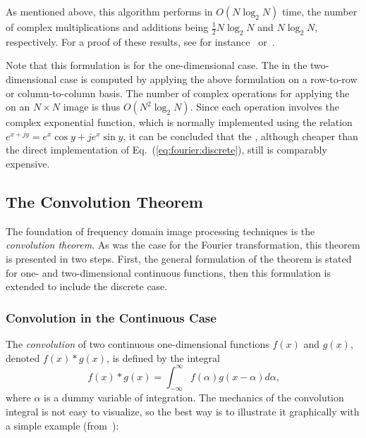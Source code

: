 As mentioned above, this algorithm performs in $O(N\log_{2}N)$ time,
the number of complex multiplications and additions being
$\frac{1}{2}N\log_{2}N$ and $N\log_{2}N$, respectively.  For a proof
of these results, see for instance~\cite{brigham} or~\cite{digim}.  

Note that this formulation is for the one-dimensional case.  The
{\fft} in the two-dimensional case is computed by applying the above
formulation on a row-to-row or column-to-column basis.
\label{pg:fft:O} The number of complex operations for applying the
{\fft} on an $N\times N$ image is thus $O(N^{2}\log_{2}N)$.  Since
each operation involves the complex exponential function, which is
normally implemented using the relation $e^{x+jy}=e^{x}\cos
y+je^{x}\sin y$, it can be concluded that the {\fft}, although
cheaper than the direct implementation of
Eq.~(\ref{eq:fourier:discrete}), still is comparably expensive.


\subsection{The Convolution Theorem}
\label{image:frequency:convolution}

The foundation of frequency domain image processing techniques is the
{\em convolution theorem\/}.  As was the case for the Fourier
transformation, this theorem is presented in two steps.  First, the
general formulation of the theorem is stated for one- and
two-dimensional continuous functions, then this formulation is
extended to include the discrete case.

\subsubsection{Convolution in the Continuous Case}

The {\em convolution\/} of two continuous one-dimensional functions
$f(x)$ and $g(x)$, denoted $f(x)\ast g(x)$, is defined by the integral
\begin{equation}
\label{eq:convolution:def}
  f(x)\ast g(x)=\int_{-\infty}^{\infty}f(\alpha)g(x-\alpha)d\alpha\mbox{,}
\end{equation}
where $\alpha$ is a dummy variable of integration.  The mechanics of
the convolution integral is not easy to visualize, so the best way is
to illustrate it graphically with a simple example
(from~\cite{digim}):

